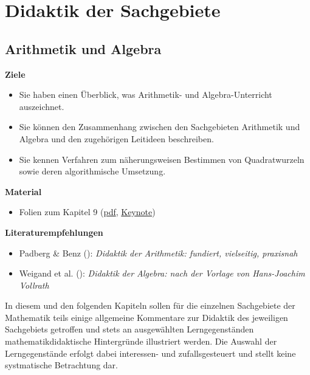 \documentclass[
]{scrbook}
\providecommand{\tightlist}{%
  \setlength{\itemsep}{0pt}\setlength{\parskip}{0pt}}
\renewenvironment{quote}{
  \list{}{
	\leftmargin0.2cm   %
    \rightmargin\leftmargin
      	\def\FrameCommand
    {%
        {\color{quoteColor}\vrule width 2pt}%
        \hspace{0pt}%
    }%
    \MakeFramed{\advance \hsize -\width \FrameRestore}    \color{quoteColor}
    }
  \item\relax
}
{\endlist\color{black}\endMakeFramed}
\theoremstyle{definition}
\theoremstyle{definition}
\theoremstyle{definition}
\theoremstyle{definition}
\theoremstyle{remark}
\begin{document}
\part*{Didaktik der Sachgebiete}\label{part-didaktik-der-sachgebiete}

\chapter{Arithmetik und Algebra}\label{arithmetik-und-algebra}

\begin{quote}
\textbf{Ziele}

\begin{itemize}
\tightlist
\item
  Sie haben einen Überblick, was Arithmetik- und Algebra-Unterricht auszeichnet.\\
\item
  Sie können den Zusammenhang zwischen den Sachgebieten Arithmetik und Algebra und den zugehörigen Leitideen beschreiben.\\
\item
  Sie kennen Verfahren zum näherungsweisen Bestimmen von Quadratwurzeln sowie deren algorithmische Umsetzung.
\end{itemize}

\textbf{Material}

\begin{itemize}
\tightlist
\item
  Folien zum Kapitel 9 (\href{files/Stoffdidaktik2024-09-ArithmetikUndAlgebra.pdf}{pdf}, \href{files/Stoffdidaktik2024-09-ArithmetikUndAlgebra.key}{Keynote})
\end{itemize}

\textbf{Literaturempfehlungen}

\begin{itemize}
\tightlist
\item
  Padberg \& Benz (): \emph{Didaktik der Arithmetik: fundiert, vielseitig, praxisnah}
\item
  Weigand et al. (): \emph{Didaktik der Algebra: nach der Vorlage von Hans-Joachim Vollrath}
\end{itemize}
\end{quote}

In diesem und den folgenden Kapiteln sollen für die einzelnen Sachgebiete der Mathematik teils einige allgemeine Kommentare zur Didaktik des jeweiligen Sachgebiets getroffen und stets an ausgewählten Lerngegenständen mathematikdidaktische Hintergründe illustriert werden. Die Auswahl der Lerngegenstände erfolgt dabei interessen- und zufallsgesteuert und stellt keine systmatische Betrachtung dar.
\end{document}
